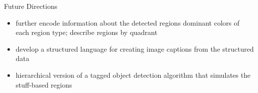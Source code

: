 \documentclass[12pt,ignorenonframetext,aspectratio=169]{beamer}
\begin{document}
\begin{frame}{Future Directions}

\begin{itemize}
\item further encode information about the detected
regions \textrightarrow{} dominant colors of each region type; describe regions by quadrant
\item develop a structured language for creating image captions from the structured
data
\item hierarchical version of a tagged object detection algorithm that simulates
the stuff-based regions
\end{itemize}

\end{frame}
\end{document}
